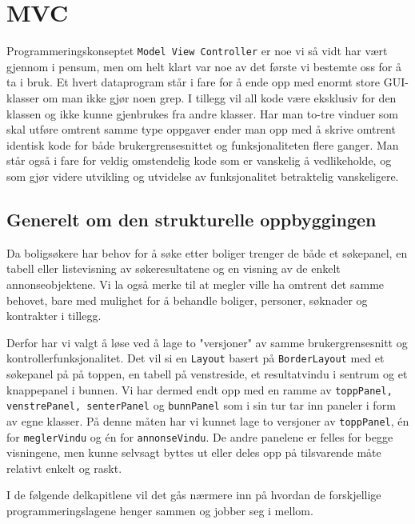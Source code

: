 \section{MVC}
Programmeringskonseptet \texttt{Model View Controller} er noe vi så vidt har vært gjennom i pensum, men om helt klart var noe av det første vi bestemte oss for å ta i bruk.
Et hvert dataprogram står i fare for å ende opp med enormt store GUI-klasser om man ikke gjør noen grep. I tillegg vil all kode være eksklusiv for den klassen og ikke kunne gjenbrukes fra andre klasser. Har man to-tre vinduer som skal utføre omtrent samme type oppgaver ender man opp med å skrive omtrent identisk kode for både brukergrensesnittet og funksjonaliteten flere ganger.
Man står også i fare for veldig omstendelig kode som er vanskelig å vedlikeholde, og som gjør videre utvikling og utvidelse av funksjonalitet betraktelig vanskeligere.

\subsection{Generelt om den strukturelle oppbyggingen}
Da boligsøkere har behov for å søke etter boliger trenger de både et søkepanel, en tabell eller listevisning av søkeresultatene og en visning av de enkelt annonseobjektene.
Vi la også merke til at megler ville ha omtrent det samme behovet, bare med mulighet for å behandle boliger, personer, søknader og kontrakter i tillegg.

Derfor har vi valgt å løse ved å lage to "versjoner" av samme brukergrensesnitt og kontrollerfunksjonalitet.
Det vil si en \texttt{Layout} basert på \texttt{BorderLayout} med et søkepanel på på toppen, en tabell på venstreside, et resultatvindu i sentrum og et knappepanel i bunnen.
Vi har dermed endt opp med en ramme av \texttt{toppPanel, venstrePanel, senterPanel} og \texttt{bunnPanel} som i sin tur tar inn paneler i form av egne klasser. På denne måten har vi kunnet lage to versjoner av \texttt{toppPanel}, én for \texttt{meglerVindu} og én for \texttt{annonseVindu}. De andre panelene er felles for begge visningene, men kunne selvsagt byttes ut eller deles opp på tilsvarende måte relativt enkelt og raskt.

I de følgende delkapitlene vil det gås nærmere inn på hvordan de forskjellige programmeringslagene henger sammen og jobber seg i mellom.

